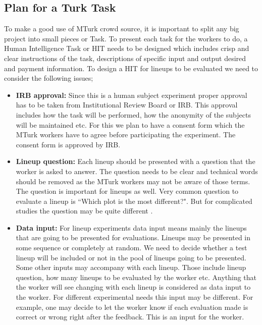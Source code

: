\documentclass[11pt]{article}
\begin{document}
\subsection{Plan for a Turk Task} \label{sec:task_plan} To make a good use of MTurk crowd source, it is important to split any big project into small pieces or Task. To present each task for the workers to do, a Human Intelligence Task or HIT needs to be designed which includes crisp and clear instructions of the task, descriptions of specific input and output desired and payment information. To design a HIT for lineups to be evaluated we need to consider the following issues;

\begin{itemize}

\item {\bf IRB approval:} Since this is a human subject experiment proper approval has to be taken from Institutional Review Board or IRB. This approval includes how the task will be performed, how the anonymity of the subjects will be maintained etc. For this we plan to have a consent form which the MTurk workers have to agree before participating the experiment. The consent form is approved by IRB.
 
\item {\bf Lineup question:} Each lineup should be presented with a question that the worker is asked to answer. The question needs to be clear and technical words should be removed as the MTurk workers may not be aware of those terms. The question is important for lineups as well. Very common question to evaluate a lineup is ``Which plot is the most different?". But for complicated studies the question may be quite different \citep{majumder:socio}.

\item {\bf Data input:} For lineup experiments data input means mainly the lineups that are going to be presented for evaluations. Lineups may be presented in some sequence or completely at random. We need to decide whether a test lineup will be included or not in the pool of lineups going to be presented. Some other inputs may accompany with each lineup. Those include lineup question, how many lineups to be evaluated by the worker etc. Anything that the worker will see changing with each lineup is considered as data input to the worker. For different experimental needs this input may be different. For example, one may decide to let the worker know if each evaluation made is correct or wrong right after the feedback. This is an input for the worker.


\end{itemize}
\end{document}
